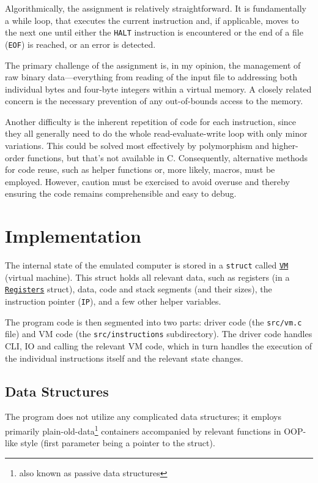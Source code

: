 \documentclass[10pt,a4paper,final]{article}
\newcommand{\code}[1]{\texttt{#1}}
\begin{document}
Algorithmically, the assignment is relatively straightforward. It is
fundamentally a while loop, that executes the current instruction and, if
applicable, moves to the next one until either the \code{HALT} instruction is
encountered or the end of a file (\code{EOF}) is reached, or an error is
detected.

The primary challenge of the assignment is, in my opinion, the management of raw
binary data---everything from reading of the input file to addressing both
individual bytes and four-byte integers within a virtual memory. A closely
related concern is the necessary prevention of any out-of-bounds access to the
memory.

Another difficulty is the inherent repetition of code for each instruction,
since they all generally need to do the whole read-evaluate-write loop with only
minor variations. This could be solved most effectively by polymorphism and
higher-order functions, but that's not available in C. Consequently, alternative
methods for code reuse, such as helper functions or, more likely, macros, must
be employed. However, caution must be exercised to avoid overuse and thereby
ensuring the code remains comprehensible and easy to debug.

\section{Implementation}
\label{sec:impl}

The internal state of the emulated computer is stored in a \code{struct} called
\hyperlink{vm}{\code{VM}} (virtual machine). This struct holds all relevant
data, such as registers (in a \hyperlink{registers}{\code{Registers}} struct),
data, code and stack segments (and their sizes), the instruction pointer
(\code{IP}), and a few other helper variables.

The program code is then segmented into two parts: driver code (the
\code{src/vm.c} file) and VM code (the \code{src/instructions} subdirectory).
The driver code handles CLI, IO and calling the relevant VM code, which in turn
handles the execution of the individual instructions itself and the relevant
state changes. 

\subsection{Data Structures}

The program does not utilize any complicated data structures; it employs
primarily plain-old-data\footnote{also known as passive data structures}
containers accompanied by relevant functions in OOP-like style (first parameter
being a pointer to the struct).
\end{document}
